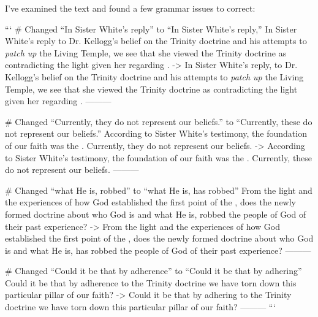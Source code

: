 I've examined the text and found a few grammar issues to correct:

```
# Changed “In Sister White's reply” to “In Sister White's reply,”
In Sister White's reply to Dr. Kellogg's belief on the Trinity doctrine and his attempts to \textit{patch up} the Living Temple, we see that she viewed the Trinity doctrine as contradicting the light given her regarding .
->
In Sister White's reply, to Dr. Kellogg's belief on the Trinity doctrine and his attempts to \textit{patch up} the Living Temple, we see that she viewed the Trinity doctrine as contradicting the light given her regarding .
---------

# Changed “Currently, they do not represent our beliefs.” to “Currently, these do not represent our beliefs.”
According to Sister White's testimony, the foundation of our faith was the . Currently, they do not represent our beliefs.
->
According to Sister White's testimony, the foundation of our faith was the . Currently, these do not represent our beliefs.
---------

# Changed “what He is, robbed” to “what He is, has robbed”
From the light and the experiences of how God established the first point of the , does the newly formed doctrine about who God is and what He is, robbed the people of God of their past experience?
->
From the light and the experiences of how God established the first point of the , does the newly formed doctrine about who God is and what He is, has robbed the people of God of their past experience?
---------

# Changed “Could it be that by adherence” to “Could it be that by adhering”
Could it be that by adherence to the Trinity doctrine we have torn down this particular pillar of our faith?
->
Could it be that by adhering to the Trinity doctrine we have torn down this particular pillar of our faith?
---------
```